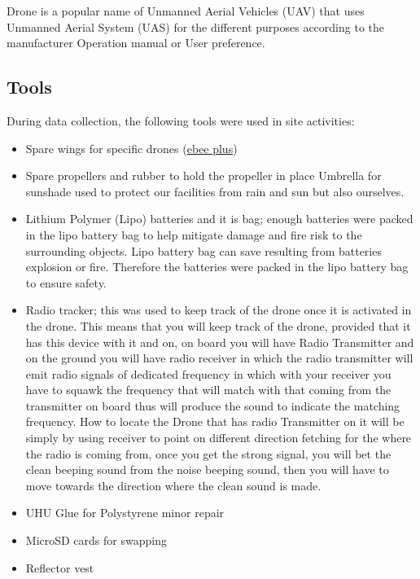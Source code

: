 \documentclass[a4paper,12pt,twoside]{article}
\begin{document}
    Drone is a popular name of Unmanned Aerial Vehicles (UAV) that uses Unmanned Aerial System (UAS) for the different purposes according to the manufacturer Operation manual or User preference. 


\subsection{Tools}

    During data collection, the following tools were used in site activities:
    \begin{itemize}
    
        \item Spare wings for specific drones (\href{https://www.sensefly.com/solution/ag-360-agricultural-drone/ebee-plus-4/}{ebee plus})
        \item Spare propellers and rubber to hold the propeller in place
        Umbrella for sunshade used to protect our facilities from rain and sun but also ourselves.
        \item Lithium Polymer (Lipo) batteries and it is bag; enough batteries were packed in the lipo battery bag to help mitigate damage and fire risk to the surrounding objects. Lipo battery bag can save resulting from batteries explosion or fire. Therefore the batteries were packed in the lipo battery bag to ensure safety. 
        \item Radio tracker; this was used to keep track of the drone once it is activated in the drone. This means that you will keep track of the drone, provided that it has this device with it and on, on board you will have Radio Transmitter and on the ground you will have radio receiver in which the radio transmitter will emit radio signals of dedicated frequency in which with your receiver you have to squawk the frequency that will match with that coming from the transmitter on board thus will produce the sound to indicate the matching frequency. How to locate the Drone that has radio Transmitter on it will be simply by using receiver to point on different direction fetching for the where the radio is coming from, once you get the strong signal, you will bet the clean beeping sound from the noise beeping sound, then you will have to move towards the direction where the clean sound is made.
        \item UHU Glue for Polystyrene minor repair
        \item MicroSD cards for swapping
        \item Reflector vest
    
    \end{itemize}
\end{document}
